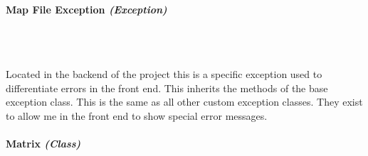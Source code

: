 \begin{FlushLeft}
    \pagebreak
    \paragraph{Map File Exception \textit{(Exception)}} \mbox{} \\

    \begin{figure}[H]
        \centering
    \end{figure}\\
    Located in the backend of the project this is a specific exception used to differentiate errors in the front end. This inherits the methods of the base exception class. This is the same as all other custom exception classes. They exist to allow me in the front end to show special error messages.
    \bk
    \pagebreak
    \paragraph{Matrix \textit{(Class)}} \mbox{} \\

    \begin{figure}[H]
        \centering
    \end{figure}\\


\end{FlushLeft}
